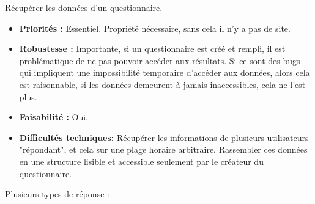 \documentclass{article}
\begin{document}
\item Récupérer les données d'un questionnaire.
\begin{itemize}[noitemsep]
    \item \textbf{Priorités : }Essentiel. Propriété nécessaire, sans cela il n'y a pas de site.
    \item \textbf{Robustesse : }Importante, si un questionnaire est créé et rempli, il est problématique de ne pas pouvoir accéder aux résultats. Si ce sont des bugs qui impliquent une impossibilité temporaire d'accéder aux données, alors cela est raisonnable, si les données demeurent à jamais inaccessibles, cela ne l'est plus.
    \item \textbf{Faisabilité : }Oui.
    \item \textbf{Difficultés techniques: } Récupérer les informations de plusieurs utilisateurs "répondant", et cela sur une plage horaire arbitraire. Rassembler ces données en une structure lisible et accessible seulement par le créateur du questionnaire.
\end{itemize}
\item Plusieurs types de réponse :
\end{document}
